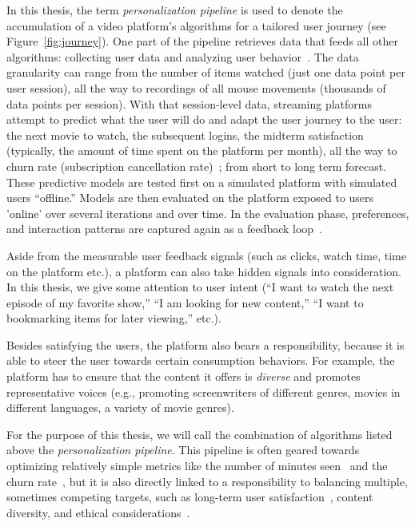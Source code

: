 In this thesis, the term \emph{personalization pipeline} is used to denote the accumulation of a video platform's algorithms for a tailored user journey (see Figure~\ref{fig:journey}). 
One part of the pipeline retrieves data that feeds all other algorithms: collecting user data and analyzing user behavior~\cite{behaviorals}.
The data granularity can range from the number of items watched (just one data point per user session), all the way to recordings of all mouse movements (thousands of data points per session). With that session-level data, streaming platforms attempt to predict what the user will do and adapt the user journey to the user: the next movie to watch, the subsequent logins, the midterm satisfaction (typically, the amount of time spent on the platform per month), all the way to churn rate (subscription cancellation rate)~\cite{longTerm}; from short to long term forecast. These predictive models are tested first on a simulated platform with simulated users ``offline.'' 
Models are then evaluated on the platform exposed to users 'online' over several iterations and over time. In the evaluation phase, preferences, and interaction patterns are captured again as a feedback loop~\cite{offlineOnlineSurvey, NetflixReco}. 

Aside from the measurable user feedback signals (such as clicks, watch time, time on the platform etc.), a platform can also take hidden signals into consideration. In this thesis, we give some attention to user intent (``I want to watch the next episode of my favorite show,'' ``I am looking for new content,'' ``I want to bookmarking items for later viewing,'' etc.). 

Besides satisfying the users, the platform also bears a responsibility, because it is able to steer the user towards certain consumption behaviors. For example, the platform has to ensure that the content it offers is \emph{diverse} and promotes representative voices (e.g., promoting screenwriters of different genres, movies in different languages, a variety of movie genres). %

For the purpose of this thesis, we will call the combination of algorithms listed above the \emph{personalization pipeline}. 
This pipeline is often geared towards optimizing relatively simple metrics like the number of minutes seen~\cite{spotifyIntent} and the churn rate~\cite{oldChurn}, but it is also directly linked to a responsibility to balancing multiple, sometimes competing targets, such as long-term user satisfaction~\cite{longTerm}, content diversity, and  ethical considerations~\cite{helberger}.


